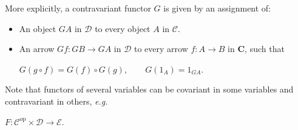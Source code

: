\documentclass[]{amsbook}
\newcommand{\qq}{\qquad}
\newcommand{\catname}[1]{\mathbf{#1}}
\newcommand{\0}{\mathbf{0}}
\newcommand{\1}{\mathbf{1}}
\newcommand{\mc}[1]{\mathcal{#1}}
\begin{document}
More explicitly, a contravariant functor $G$ is given by an assignment of:
\begin{itemize}
    \item An object $GA$ in $\mc{D}$ to every object $A$ in $\mc{C}$.
    \item An arrow $Gf: GB \to GA$ in $\mc{D}$ to every arrow $f: A \to B$ in
    $\catname{C}$, such that
    \begin{center}
        $G(g \circ f) = G(f) \circ G(g), \qq G(1_A) = 1_{GA}$.
    \end{center}
\end{itemize}
Note that functors of several variables can be covariant in some variables and
contravariant in others, \emph{e.g.}
\begin{center}
    $F: \mc{C}^{\text{op}} \times \mc{D} \to \mc{E}$.
\end{center}
\end{document}
